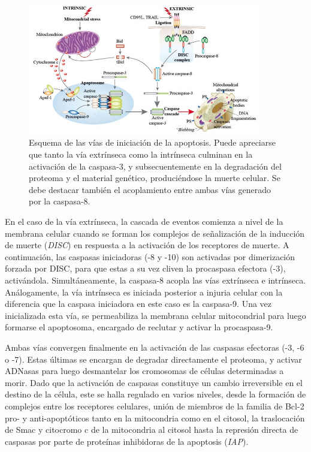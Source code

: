 \begin{figure}
    \centering
    \includegraphics[width=0.90\textwidth]{./img/caspasa0.png}
    \caption{Esquema de las vías de iniciación de la apoptosis. Puede apreciarse que tanto la vía extrínseca como la intrínseca culminan en la activación de la caspasa-3, y subsecuentemente en la degradación del proteoma y el material genético, produciéndose la muerte celular. Se debe destacar también el acoplamiento entre ambas vías generado por la caspasa-8\cite{FotoVias}.}
    \label{fig:Vias}
\end{figure}

En el caso de la vía extrínseca, la cascada de eventos comienza a nivel de la membrana celular cuando se forman los complejos de señalización de la inducción de muerte (\textit{DISC}) en respuesta a la activación de los receptores de muerte. A continuación, las caspasas iniciadoras (-8 y -10) son activadas por dimerización forzada por DISC, para que estas a su vez cliven la procaspasa efectora (-3), activándola\cite{Albeck2008}. Simultáneamente, la caspasa-8 acopla las vías extrínseca e intrínseca\cite{Harrington2008}. Análogamente, la vía intrínseca es iniciada posterior a injuria celular con la diferencia que la caspasa iniciadora en este caso es la caspasa-9. Una vez inicializada esta vía, se permeabiliza la membrana celular mitocondrial para luego formarse el apoptosoma, encargado de reclutar y activar la procaspasa-9\cite{Harrington2008}.

Ambas vías convergen finalmente en la activación de las caspasas efectoras (-3, -6 o -7). Estas últimas se encargan de degradar directamente el proteoma, y activar ADNasas para luego desmantelar los cromosomas de células determinadas a morir. Dado que la activación de caspasas constituye un cambio irreversible en el destino de la célula, este se halla regulado en varios niveles, desde la formación de complejos entre los receptores celulares, unión de miembros de la familia de Bcl-2 pro- y anti-apoptóticos tanto en la mitocondria como en el citosol, la traslocación de Smac y citocromo c de la mitocondria al citosol hasta la represión directa de caspasas por parte de proteínas inhibidoras de la apoptosis (\textit{IAP})\cite{Albeck2008}.

